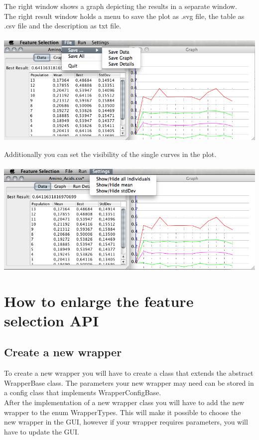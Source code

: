 \documentclass[headsepline,12pt,a4paper]{scrartcl}
\begin{document}
The right window shows a graph depicting the results in a separate window.\\

The right result window holds a menu to save the plot as
.svg file, the
table as .csv file and the description as txt file.\\

~\includegraphics[scale = 0.5]{save.png}

Additionally you can set the visibility of the single curves in the plot. \\

~\includegraphics[scale = 0.5]{show.png}

\section{How to enlarge the feature selection API}

\subsection{Create a new wrapper}

To create a new wrapper you will have to create a class that extends the
abstract WrapperBase class. The parameters your new wrapper may need
can be stored in a config class that implements WrapperConfigBase.\\
After the implementation of a new wrapper class you will have to add the
new wrapper to the enum WrapperTypes. This will make it possible to choose the
new wrapper in the GUI, however if your wrapper requires parameters, you will have to update the GUI.
\end{document}
